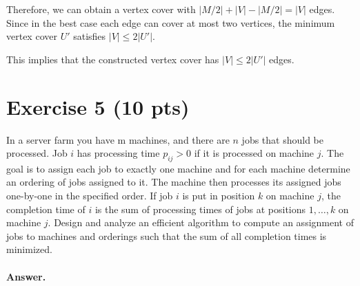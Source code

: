 \documentclass[a4paper]{article}
\begin{document}
Therefore, we can obtain a vertex cover with $|M/2| + |V| - |M/2| = |V|$ edges. Since in the best case each edge can cover at most two vertices, the minimum vertex cover $U'$ satisfies $|V| \le 2 |U'|$.

This implies that the constructed vertex cover has $|V| \le 2 |U'|$ edges.

\section*{Exercise 5 (10 pts)}

In a server farm you have m machines, and there are $n$ jobs that should be processed. Job $i$ has processing time $p_{ij} > 0$ if it is processed on machine $j$. The goal is to assign each job to exactly one machine and for each machine determine an ordering of jobs assigned to it. The machine then processes its assigned jobs one-by-one in the specified order. If job $i$ is put in position $k$ on machine $j$, the completion time of $i$ is the sum of processing times of jobs at positions $1, \ldots, k$ on machine $j$. Design and analyze an efficient algorithm to compute an assignment of jobs to machines and orderings such that the sum of all completion times is minimized.

\paragraph{Answer.}






\end{document}
